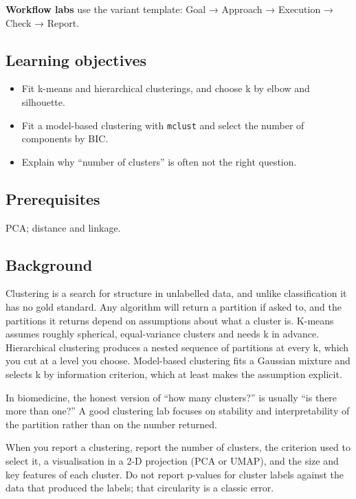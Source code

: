 \documentclass[
]{article}
\author{}
\date{\vspace{-2.5em}}
\providecommand{\tightlist}{%
  \setlength{\itemsep}{0pt}\setlength{\parskip}{0pt}}
\begin{document}
\textbf{Workflow labs} use the variant template: Goal → Approach →
Execution → Check → Report.

\subsection{Learning objectives}\label{learning-objectives}

\begin{itemize}
\tightlist
\item
  Fit k-means and hierarchical clusterings, and choose k by elbow and
  silhouette.
\item
  Fit a model-based clustering with \texttt{mclust} and select the
  number of components by BIC.
\item
  Explain why ``number of clusters'' is often not the right question.
\end{itemize}

\subsection{Prerequisites}\label{prerequisites}

PCA; distance and linkage.

\subsection{Background}\label{background}

Clustering is a search for structure in unlabelled data, and unlike
classification it has no gold standard. Any algorithm will return a
partition if asked to, and the partitions it returns depend on
assumptions about what a cluster is. K-means assumes roughly spherical,
equal-variance clusters and needs k in advance. Hierarchical clustering
produces a nested sequence of partitions at every k, which you cut at a
level you choose. Model-based clustering fits a Gaussian mixture and
selects k by information criterion, which at least makes the assumption
explicit.

In biomedicine, the honest version of ``how many clusters?'' is usually
``is there more than one?'' A good clustering lab focuses on stability
and interpretability of the partition rather than on the number
returned.

When you report a clustering, report the number of clusters, the
criterion used to select it, a visualisation in a 2-D projection (PCA or
UMAP), and the size and key features of each cluster. Do not report
p-values for cluster labels against the data that produced the labels;
that circularity is a classic error.
\end{document}
